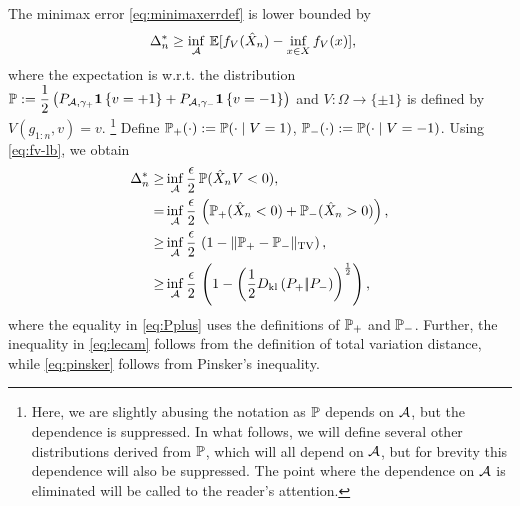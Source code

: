 The minimax error \eqref{eq:minimaxerrdef} is lower bounded by
\begin{align}
\MoveEqLeft 
\Delta_n^{*} %
  \ge  \inf_{\A} \,  \E[f_V(\hat X_n) - \inf_{x \in X}
  f_V(x)],\label{eq:avg-bd}
  \end{align}
where the expectation is w.r.t. the distribution $\P:= \dfrac{1}{2} \left(P_{\A, \gamma_+} \indic{v=+1} + P_{\A, \gamma_-}\indic{v=-1}\right)$ and $V: \Omega \to \{\pm 1 \}$ is defined by $V(g_{1:n},v) = v$.%
\footnote{Here, we are slightly abusing the notation as $\P$ depends on $\A$, but the dependence is suppressed.
In what follows, we will define several other distributions derived from $\P$, which will all depend on $\A$, but
for brevity this dependence will also be suppressed.
The point where the dependence on $\A$ is eliminated will be called to the reader's attention.}
Define $\P_{+}(\cdot) := \P(\cdot\mid V=1)$, $\P_{-}(\cdot) := \P(\cdot\mid
V=-1)$. 
Using \eqref{eq:fv-lb}, we obtain
\begin{align}
\Delta_n^{*}  \ge & \inf_{\A} \dfrac{\epsilon}{2}\,  \P(\hat X_n V < 0), \label{eq:strong-convex-bd}\\
  = & \inf_{\A} \dfrac{\epsilon }{2} \, \left(\P_{+}(\hat X_n < 0) + \P_{-}(\hat X_n > 0)\right), \label{eq:Pplus}\\
  \ge &\inf_{\A} \dfrac{\epsilon }{2} \,\left(1 - \tvnorm{\P_{+}- \P_{-}}\right), \label{eq:lecam}\\
  \ge &\inf_{\A} \dfrac{\epsilon }{2}  \,\left( 1 - \left(\frac12\dkl{P_{+}}{P_{-}}\right)^{\frac{1}{2}}\right), \label{eq:pinsker}
\end{align}
where 
the equality in \eqref{eq:Pplus} uses the definitions of $\P_+$ and $\P_-$.  
Further, the inequality in \eqref{eq:lecam} follows from the definition of total variation distance, while \eqref{eq:pinsker} follows from Pinsker's inequality. %


